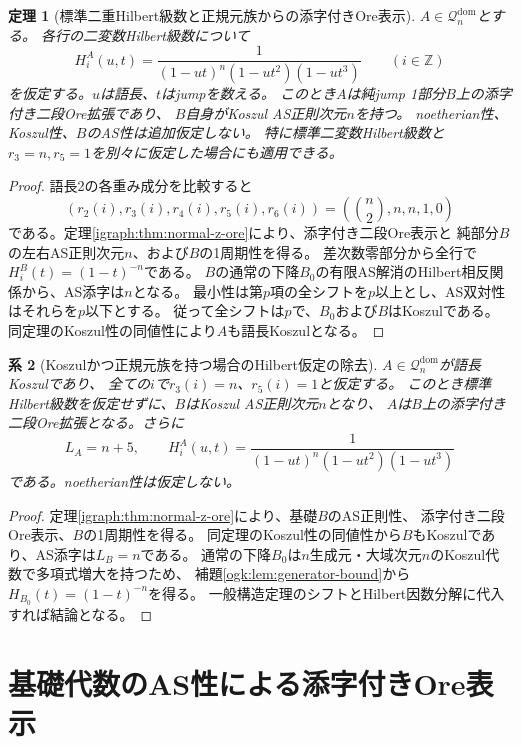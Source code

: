 \documentclass[11pt,a4paper]{ltjsarticle}
\newtheorem{theorem}{定理}[section]
\newtheorem{corollary}[theorem]{系}
\theoremstyle{definition}
\begin{document}
\begin{theorem}[標準二重Hilbert級数と正規元族からの添字付きOre表示]
\label{ibar:thm:standard-hilbert-ore}
$A\in\mathcal Q_n^{\mathrm{dom}}$とする。
各行の二変数Hilbert級数について
\[
H_i^A(u,t)=\frac1{(1-ut)^n(1-ut^2)(1-ut^3)}
\qquad(i\in\mathbb Z)
\]
を仮定する。$u$は語長、$t$はjumpを数える。
このとき$A$は純jump 1部分$B$上の添字付き二段Ore拡張であり、
$B$自身がKoszul AS正則次元$n$を持つ。
noetherian性、Koszul性、$B$のAS性は追加仮定しない。
特に標準二変数Hilbert級数と$r_3=n,r_5=1$を別々に仮定した場合にも適用できる。
\end{theorem}
\begin{proof}
語長2の各重み成分を比較すると
\[
(r_2(i),r_3(i),r_4(i),r_5(i),r_6(i))
=\left(\binom n2,n,n,1,0\right)
\]
である。定理\ref{igraph:thm:normal-z-ore}により、添字付き二段Ore表示と
純部分$B$の左右AS正則次元$n$、および$B$の1周期性を得る。
差次数零部分から全行で$H_i^B(t)=(1-t)^{-n}$である。
$B$の通常の下降$B_0$の有限AS解消のHilbert相反関係から、AS添字は$n$となる。
最小性は第$p$項の全シフトを$p$以上とし、AS双対性はそれらを$p$以下とする。
従って全シフトは$p$で、$B_0$および$B$はKoszulである。
同定理のKoszul性の同値性により$A$も語長Koszulとなる。
\end{proof}

\begin{corollary}[Koszulかつ正規元族を持つ場合のHilbert仮定の除去]
\label{ibar:cor:koszul-normal-z}
$A\in\mathcal Q_n^{\mathrm{dom}}$が語長Koszulであり、
全ての$i$で$r_3(i)=n$、$r_5(i)=1$と仮定する。
このとき標準Hilbert級数を仮定せずに、$B$はKoszul AS正則次元$n$となり、
$A$は$B$上の添字付き二段Ore拡張となる。さらに
\[
L_A=n+5,\qquad
H_i^A(u,t)=\frac1{(1-ut)^n(1-ut^2)(1-ut^3)}
\]
である。noetherian性は仮定しない。
\end{corollary}
\begin{proof}
定理\ref{igraph:thm:normal-z-ore}により、基礎$B$のAS正則性、
添字付き二段Ore表示、$B$の1周期性を得る。
同定理のKoszul性の同値性から$B$もKoszulであり、AS添字は$L_B=n$である。
通常の下降$B_0$は$n$生成元・大域次元$n$のKoszul代数で多項式増大を持つため、
補題\ref{ogk:lem:generator-bound}から$H_{B_0}(t)=(1-t)^{-n}$を得る。
一般構造定理のシフトとHilbert因数分解に代入すれば結論となる。
\end{proof}

\section{基礎代数のAS性による添字付きOre表示}\label{genidx:sec:as-base-ore}
\end{document}
